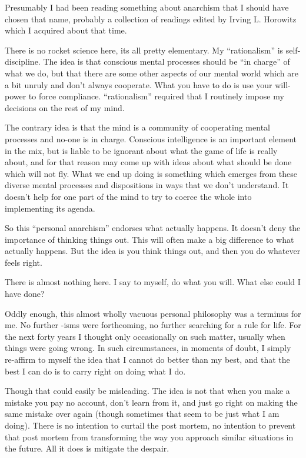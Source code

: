 Presumably I had been reading something about anarchism that I should have chosen that name, probably a collection of readings edited by Irving L. Horowitz which I acquired about that time.

There is no rocket science here, its all pretty elementary.
My ``rationalism'' is self-discipline.
The idea is that conscious mental processes should be ``in charge'' of what we do, but that there are some other aspects of our mental world which are a bit unruly and don't always cooperate.
What you have to do is use your will-power to force compliance.
``rationalism'' required that I routinely impose my decisions on the rest of my mind.

The contrary idea is that the mind is a community of cooperating mental processes and no-one is in charge.
Conscious intelligence is an important element in the mix, but is liable to be ignorant about what the game of life is really about, and for that reason may come up with ideas about what should be done which will not fly.
What we end up doing is something which emerges from these diverse mental processes and dispositions in ways that we don't understand.
It doesn't help for one part of the mind to try to coerce the whole into implementing its agenda.

So this ``personal anarchism'' endorses what actually happens.
It doesn't deny the importance of thinking things out.
This will often make a big difference to what actually happens.
But the idea is you think things out, and then you do whatever feels right.

There is almost nothing here.
I say to myself, do what you will.
What else could I have done?

Oddly enough, this almost wholly vacuous personal philosophy was a terminus for me.
No further -isms were forthcoming, no further searching for a rule for life.
For the next forty years I thought only occasionally on such matter, usually when things were going wrong.
In such circumstances, in moments of doubt, I simply re-affirm to myself the idea that I cannot do better than my best, and that the best I can do is to carry right on doing what I do.

Though that could easily be misleading.
The idea is not that when you make a mistake you pay no account, don't learn from it, and just go right on making the same mistake over again (though sometimes that seem to be just what I am doing).
There is no intention to curtail the post mortem, no intention to prevent that post mortem from transforming the way you approach similar situations in the future.
All it does is mitigate the despair.

